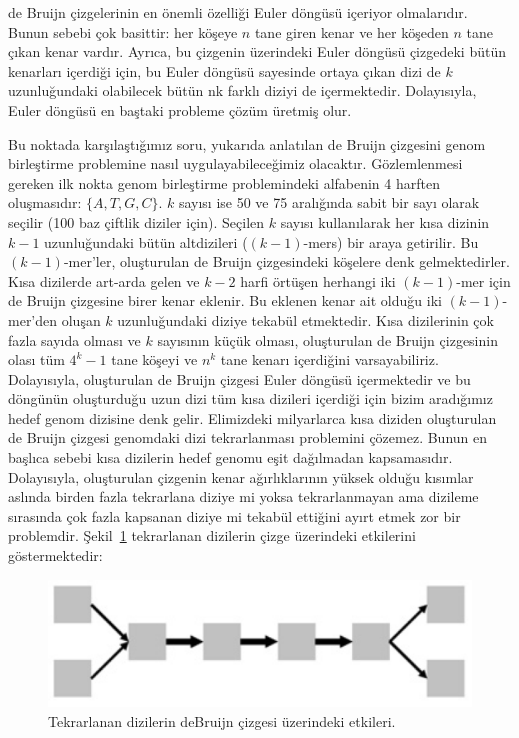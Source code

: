de Bruijn çizgelerinin en önemli özelliği Euler döngüsü içeriyor olmalarıdır. Bunun sebebi çok basittir: her köşeye $n$ tane giren kenar ve her köşeden $n$ tane çıkan kenar vardır. Ayrıca, bu çizgenin üzerindeki Euler döngüsü çizgedeki bütün kenarları içerdiği için, bu Euler döngüsü sayesinde ortaya çıkan dizi de $k$ uzunluğundaki olabilecek bütün nk farklı diziyi de içermektedir. Dolayısıyla, Euler döngüsü en baştaki probleme çözüm üretmiş olur.

	Bu noktada karşılaştığımız soru, yukarıda anlatılan de Bruijn çizgesini genom birleştirme problemine nasıl uygulayabileceğimiz olacaktır. Gözlemlenmesi gereken ilk nokta genom birleştirme problemindeki alfabenin 4 harften oluşmasıdır: $\{A, T, G, C\}$. $k$ sayısı ise 50 ve 75 aralığında sabit bir sayı olarak seçilir (100 baz çiftlik diziler için). Seçilen $k$ sayısı kullanılarak her kısa dizinin $k-1$ uzunluğundaki bütün altdizileri ($(k-1)$-mers) bir araya getirilir. Bu $(k-1)$-mer'ler, oluşturulan de Bruijn çizgesindeki köşelere denk gelmektedirler. Kısa dizilerde art-arda gelen ve $k-2$ harfi örtüşen herhangi iki $(k-1)$-mer için de Bruijn çizgesine birer kenar eklenir. Bu eklenen kenar ait olduğu iki $(k-1)$-mer'den oluşan $k$ uzunluğundaki diziye tekabül etmektedir.
	Kısa dizilerinin çok fazla sayıda olması ve $k$ sayısının küçük olması, oluşturulan de Bruijn çizgesinin olası tüm $4^k-1$ tane köşeyi ve $n^k$ tane kenarı içerdiğini varsayabiliriz. Dolayısıyla, oluşturulan de Bruijn çizgesi Euler döngüsü içermektedir ve bu döngünün oluşturduğu uzun dizi tüm kısa dizileri içerdiği için bizim aradığımız hedef genom dizisine denk gelir.
	Elimizdeki milyarlarca kısa diziden oluşturulan de Bruijn çizgesi genomdaki dizi tekrarlanması problemini çözemez. Bunun en başlıca sebebi kısa dizilerin hedef genomu eşit dağılmadan kapsamasıdır. Dolayısıyla, oluşturulan çizgenin kenar ağırlıklarının yüksek olduğu kısımlar aslında birden fazla tekrarlana diziye mi yoksa tekrarlanmayan ama dizileme sırasında çok fazla kapsanan diziye mi tekabül ettiğini ayırt etmek zor bir problemdir. Şekil~\ref{fig:debruijn-repeat} tekrarlanan dizilerin çizge üzerindeki etkilerini göstermektedir:

\begin{figure}[htb]
  \begin{center}
    \includegraphics[scale=0.4]{debruijn-repeat-problem.png}
  \end{center}
  \caption{Tekrarlanan dizilerin deBruijn çizgesi üzerindeki etkileri.}
  \label{fig:debruijn-repeat}
\end{figure}

